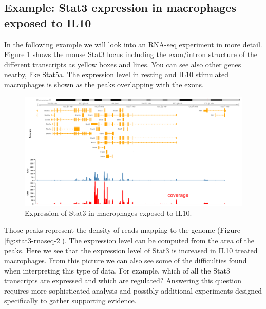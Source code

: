 \documentclass[]{book}
\theoremstyle{definition}
\theoremstyle{definition}
\theoremstyle{definition}
\theoremstyle{remark}
\begin{document}
\subsection{Example: Stat3 expression in macrophages exposed to
IL10}\label{example-stat3-expression-in-macrophages-exposed-to-il10}

In the following example we will look into an RNA-seq experiment in more
detail. Figure \ref{fig:stat3-rnaseq-1} shows the mouse Stat3 locus
including the exon/intron structure of the different transcripts as
yellow boxes and lines. You can see also other genes nearby, like
Stat5a. The expression level in resting and IL10 stimulated macrophages
is shown as the peaks overlapping with the exons.

\begin{figure}
\includegraphics[width=22.53in]{pic/stat3_rnaseq_1} \caption{Expression of Stat3 in macrophages exposed to IL10.}\label{fig:stat3-rnaseq-1}
\end{figure}

Those peaks represent the density of reads mapping to the genome (Figure
\ref{fig:stat3-rnaseq-2}). The expression level can be computed from the
area of the peaks. Here we see that the expression level of Stat3 is
increased in IL10 treated macrophages. From this picture we can also see
some of the difficulties found when interpreting this type of data. For
example, which of all the Stat3 transcripts are expressed and which are
regulated? Answering this question requires more sophisticated analysis
and possibly additional experiments designed specifically to gather
supporting evidence.
\end{document}
